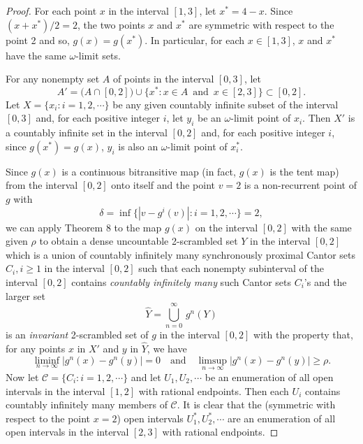 \documentclass[12pt]{article}
\begin{document}
\begin{proof}
For each point $x$ in the interval $[1, 3]$, let $x^* = 4 - x$.  Since $(x+x^*)/2 = 2$, the two points $x$ and $x^*$ are symmetric with respect to the point 2 and so, $g(x) = g(x^*)$.  In particular, for each $x \in [1, 3]$, $x$ and $x^*$ have the same $\omega$-limit sets.  

For any nonempty set $A$ of points in the interval $[0, 3]$, let $$A' = \bigl(A \cap [0, 2]\bigr) \cup \big\{ x^* : x \in A \,\,\, \text{and} \,\,\, x \in [2, 3] \big\} \subset [0, 2].$$  Let $X = \{ x_i : i = 1, 2, \cdots \}$ be any given countably infinite subset of the interval $[0, 3]$ and, for each positive integer $i$, let $y_i$ be an $\omega$-limit point of $x_i$.  Then $X'$ is a countably infinite set in the interval $[0, 2]$ and, for each positive integer $i$, since $g(x^*) = g(x)$, $y_i$ is also an $\omega$-limit point of $x_i^*$.  

Since $g(x)$ is a continuous bitransitive map (in fact, $g(x)$ is the tent map) from the interval $[0, 2]$ onto itself and the point $v = 2$ is a non-recurrent point of $g$ with $$\delta = \inf \big\{ |v - g^i(v)| : i = 1, 2, \cdots \big\} = 2,$$ we can apply Theorem 8 to the map $g(x)$ on the interval $[0, 2]$ with the same given $\rho$ to obtain a dense uncountable 2-scrambled set $Y$ in the interval $[0, 2]$ which is a union of countably infinitely many synchronously proximal Cantor sets $C_i, i \ge 1$ in the interval $[0, 2]$ such that each nonempty subinterval of the interval $[0, 2]$ contains {\it countably infinitely many} such Cantor sets $C_i$'s and the larger set $$\widehat Y = \bigcup_{n=0}^\infty \, g^n(Y)$$ is an {\it invariant} 2-scrambled set of $g$ in the interval $[0, 2]$ with the property that, for any points $x$ in $X'$ and $y$ in $\widehat Y$, we have 
$$
\liminf_{n \to \infty} \big|g^n(x) - g^n(y)\big| = 0 \quad \text{and} \quad \limsup_{n \to \infty} \big|g^n(x) - g^n(y)\big| \ge \rho.
$$
\indent Now let $\mathcal C = \{ C_i : i = 1, 2, \cdots \}$ and let $U_1, U_2, \cdots$ be an enumeration of all open intervals in the interval $[1, 2]$ with rational endpoints.  Then each $U_i$ contains countably infinitely many members of $\mathcal C$.  It is clear that the (symmetric with respect to the point $x = 2$) open intervals $U_1^*, U_2^*, \cdots$ are an enumeration of all open intervals in the interval $[2, 3]$ with rational endpoints.


\end{proof}
\end{document}
